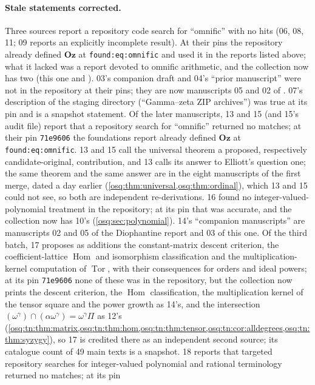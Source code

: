 \documentclass[11pt,letterpaper]{article}
\numberwithin{equation}{section}
\theoremstyle{definition}
\theoremstyle{remark}
\theoremstyle{plain}
\newcommand{\Oz}{\mathbf{Oz}}
\newcommand{\Hom}{\operatorname{Hom}}
\newcommand{\Tor}{\operatorname{Tor}}
\begin{document}
\paragraph{Stale statements corrected.} Three sources report a repository code search for
``omnific'' with no hits (06, 08, 11; 09 reports an explicitly incomplete result). At their pins
the repository already defined $\Oz$ at \nolinkurl{found:eq:omnific} and used it in the reports
listed above; what it lacked was a report devoted to omnific arithmetic, and the collection now has
two (this one and \cite{RepoOdg}). 03's companion draft and 04's ``prior manuscript'' were not in the
repository at their pins; they are now manuscripts 05 and 02 of \cite{RepoOdg}. 07's description of
the staging directory (``Gamma--zeta ZIP archives'') was true at its pin and is a snapshot statement.
Of the later manuscripts, 13 and 15 (and 15's audit file) report that a repository search for ``omnific''
returned no matches; at their pin \texttt{71e9606} the foundations report already defined $\Oz$ at
\nolinkurl{found:eq:omnific}. 13 and 15 call the universal theorem a proposed, respectively candidate-original,
contribution, and 13 calls its answer to Elliott's question one; the same theorem and the same answer are in the
eight manuscripts of the first merge, dated a day earlier (\cref{osq:thm:universal,osq:thm:ordinal}), which 13 and 15
could not see, so both are independent re-derivations. 16 found no integer-valued-polynomial treatment in the
repository; at its pin that was accurate, and the collection now has 10's (\cref{osq:sec:polynomial}). 14's
``companion manuscripts'' are manuscripts 02 and 05 of the Diophantine report \cite{RepoOdg} and 03 of this one.
Of the third batch, 17 proposes as additions the constant-matrix descent criterion, the coefficient-lattice $\Hom$
and isomorphism classification and the multiplication-kernel computation of $\Tor$, with their consequences for
orders and ideal powers; at its pin \texttt{71e9606} none of these was in the repository, but the collection now
prints the descent criterion, the $\Hom$ classification, the multiplication kernel of the tensor square and the
power growth as 14's, and the intersection $(\omega^\gamma)\cap(\alpha\omega^\gamma)=\omega^\gamma\Pi$ as 12's
(\cref{osq:tn:thm:matrix,osq:tn:thm:hom,osq:tn:thm:tensor,osq:tn:cor:alldegrees,osq:tn:thm:syzygy}), so 17 is credited
there as an independent second source; its catalogue count of 49 main texts is a snapshot. 18 reports that targeted
repository searches for integer-valued polynomial and rational terminology returned no matches; at its pin
\end{document}
